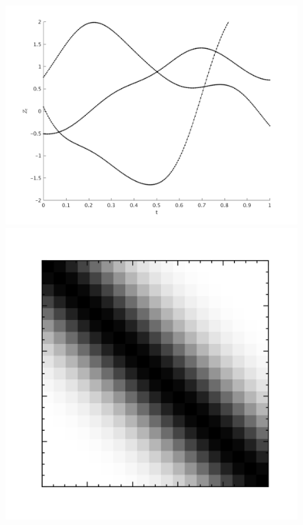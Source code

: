 \begin{enumerate}
\begin{figure}
\centering
\includegraphics[scale=.5]{figures/sqexp3.png}
\includegraphics[scale=.4]{figures/covariancematrix_sqexp.png}

\end{figure}
\end{enumerate}

